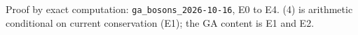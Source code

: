 Proof by exact computation: \texttt{ga\_bosons\_2026-10-16}, E0 to E4. (4) is arithmetic conditional on current conservation (E1); the GA content is E1 and E2.
